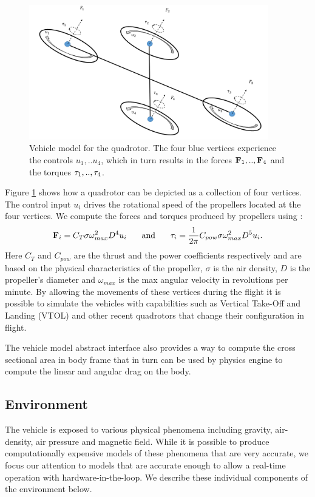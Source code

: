 \documentclass[graybox]{svmult}
\begin{document}
\begin{figure}[ttbp]
\includegraphics[width=0.93\textwidth]{forces.PNG}
\caption{Vehicle model for the quadrotor. The four blue vertices experience the controls $u_1, .. u_4$, which in turn results in the forces ${\bf F}_1, .., {\bf F}_4$ and the torques ${\bf \tau}_1, .., {\bf \tau}_4$.}
\label{fig:quad}
\end{figure}
Figure \ref{fig:quad} shows how a quadrotor can be depicted as a collection of four vertices. The control input $u_i$ drives the rotational speed of the propellers located at the four vertices. We compute the forces and torques produced by propellers using \cite{propdb}:
\begin{align*}
{\bf F}_i = C_T \sigma \omega_{max}^2 D^4 u_i \mbox{\hspace{0.25in}and\hspace{0.25in}}
{\bf \tau}_i = \frac{1}{2\pi}C_{pow} \sigma \omega_{max}^2 D^5 u_i.
\end{align*}
Here $C_T$ and $C_{pow}$ are the thrust and the power coefficients respectively and are based on the physical characteristics of the propeller, $\sigma$ is the air density, $D$ is the propeller's diameter and $\omega_{max}$ is the max angular velocity in revolutions per minute. By allowing the movements of these vertices during the flight it is possible to simulate the vehicles with capabilities such as Vertical Take-Off and Landing  (VTOL) and other recent quadrotors that change their configuration in flight.

The vehicle model abstract interface also provides a way to compute the cross sectional area in body frame that in turn can be used by physics engine to compute the linear and angular drag on the body. 

\subsection{Environment}
The vehicle is exposed to various physical phenomena including gravity, air-density, air pressure and magnetic field. While it is possible to produce computationally expensive models of these phenomena that are very accurate, we focus our attention to models that are accurate enough to allow a real-time operation with hardware-in-the-loop. We describe these individual components of the environment below.
\end{document}
